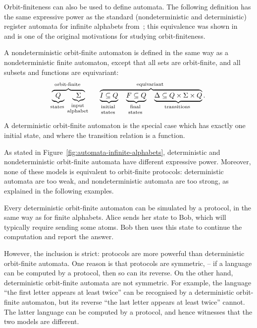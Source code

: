 Orbit-finiteness can also be used to define automata. The following definition has the same expressive power as the standard (nondeterministic and deterministic) register automata for infinite alphabets from~\cite{kaminskiFiniteMemoryAutomata1994}; this equivalence was shown in~\cite[Lemma 6.3]{bojanczykAutomataTheoryNominal2014} and is one of the original motivations for studying orbit-finiteness.

\begin{definition}
    \label{def:orbit-finite-automata}
    A nondeterministic orbit-finite automaton is defined in the same way as a nondeterministic finite automaton, except that all sets are orbit-finite, and all subsets and functions are equivariant: 
\begin{align*}
    \myoverbrace{
        \myunderbrace{Q}{states} \quad 
        \myunderbrace{\Sigma}{input \\ alphabet}
    }
    {orbit-finite}
    \qquad
    \myoverbrace{
        \myunderbrace{I \subseteq Q}{initial \\ states} \quad 
        \myunderbrace{F \subseteq Q}{final \\ states} \quad 
        \myunderbrace{\Delta \subseteq Q \times \Sigma \times Q}{transitions}
    }{equivariant}.
\end{align*}
A deterministic orbit-finite automaton is the special case which has exactly one initial state, and where the transition relation is a function.
\end{definition}

As stated in Figure~\ref{fig:automata-infinite-alphabets}, deterministic and nondeterministic orbit-finite automata have different expressive power. Moreover, none of these models is equivalent to orbit-finite protocols: deterministic automata are too weak, and nondeterministic automata are too strong, as explained in the following examples.

\begin{myexample}
    \label{ex:protocol-not-dofa}
     Every deterministic orbit-finite automaton can be simulated by a protocol, in the same way as for finite alphabets. Alice sends her state to Bob, which will typically require sending some atoms. Bob then uses this state to continue the computation and report the answer. 
    
    However, the inclusion is strict: protocols are more powerful than deterministic orbit-finite automata. One reason is that protocols are symmetric, -- if a language can be computed by a protocol, then so can its reverse. On the other hand, deterministic orbit-finite automata are not symmetric. For example, the language ``the first letter appears at least twice'' can be recognised by a deterministic orbit-finite automaton, but its reverse ``the last letter appears at least twice'' cannot. The latter language can be computed by a protocol, and hence witnesses that the two models are different. 
\end{myexample}

